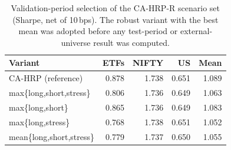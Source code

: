 \begin{table}[!htbp]\centering\small
\caption{Validation-period selection of the CA-HRP-R scenario set (Sharpe, net of 10\,bps). The robust variant with the best mean was adopted before any test-period or external-universe result was computed.}\label{tab:robustdesign}
\begin{tabular}{l rrrr}\toprule
Variant & ETFs & NIFTY & US & Mean\\\midrule
CA-HRP (reference) & 0.878 & 1.738 & 0.651 & 1.089\\
max\{long,short,stress\} & 0.806 & 1.736 & 0.649 & 1.063\\
max\{long,short\} & 0.865 & 1.736 & 0.649 & 1.083\\
max\{long,stress\} & 0.768 & 1.738 & 0.651 & 1.052\\
mean\{long,short,stress\} & 0.779 & 1.737 & 0.650 & 1.055\\
\bottomrule\end{tabular}\end{table}